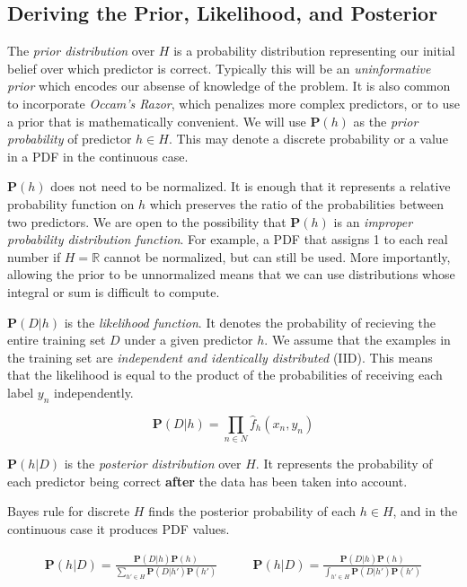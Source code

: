 \documentclass[twoside]{article}
\begin{document}
\subsection{Deriving the Prior, Likelihood, and Posterior}

The \textit{prior distribution} over \(H\) is a probability distribution representing our initial belief over which predictor is correct. Typically this will be an \textit{uninformative prior} which encodes our absense of knowledge of the problem. It is also common to incorporate \textit{Occam's Razor}, which penalizes more complex predictors, or to use a prior that is mathematically convenient. We will use \(\mathbf{P}(h)\) as the \textit{prior probability} of predictor \(h \in H\). This may denote a discrete probability or a value in a PDF in the continuous case.

\(\mathbf{P}(h)\) does not need to be normalized. It is enough that it represents a relative probability function on \(h\) which preserves the ratio of the probabilities between two predictors. We are open to the possibility that \(\mathbf{P}(h)\) is an \textit{improper probability distribution function}. For example, a PDF that assigns 1 to each real number if \(H=\mathbb{R}\) cannot be normalized, but can still be used. More importantly, allowing the prior to be unnormalized means that we can use distributions whose integral or sum is difficult to compute.

\(\mathbf{P}(D|h)\) is the \textit{likelihood function}. It denotes the probability of recieving the entire training set \(D\) under a given predictor \(h\). We assume that the examples in the training set are \textit{independent and identically distributed} (IID). This means that the likelihood is equal to the product of the probabilities of receiving each label \(y_n\) independently.

\begin{equation}
\label{eq:likelihood_expansion}
\mathbf{P}(D|h)=\prod_{n \in N} \hat{f}_h(x_n,y_n)
\end{equation}

\(\mathbf{P}(h|D)\) is the \textit{posterior distribution} over \(H\). It represents the probability of each predictor being correct \textbf{after} the data has been taken into account.

Bayes rule for discrete \(H\) finds the posterior probability of each \(h \in H\), and in the continuous case it produces PDF values.

\begin{align}
\mathbf{P}(h|D)=\frac{\mathbf{P}(D|h)\mathbf{P}(h)}{\sum_{h' \in H}\mathbf{P}(D|h')\mathbf{P}(h')} &
\qquad\mathbf{P}(h|D)=\frac{\mathbf{P}(D|h)\mathbf{P}(h)}{\int_{h' \in H}\mathbf{P}(D|h')\mathbf{P}(h')}
\end{align}
\end{document}

